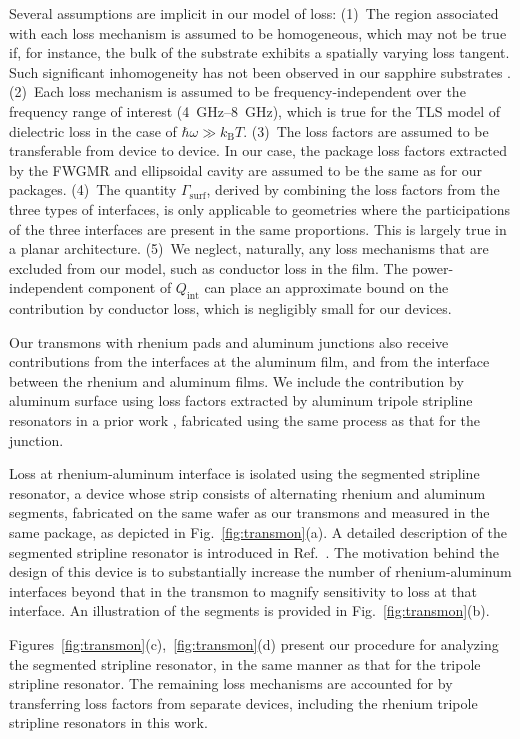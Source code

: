 \documentclass[
    reprint,
    superscriptaddress,
    amsmath,amssymb,
    aps,
    prb,
    floatfix,
]{revtex4-2}
\begin{document}
Several assumptions are implicit in our model of loss: (1)~The region associated with each loss mechanism is assumed to be homogeneous, which may not be true if, for instance, the bulk of the substrate exhibits a spatially varying loss tangent. Such significant inhomogeneity has not been observed in our sapphire substrates \cite{read2023,ganjam2024}. (2)~Each loss mechanism is assumed to be frequency-independent over the frequency range of interest (\SIrange{4}{8}{\giga\hertz}), which is true for the TLS model of dielectric loss in the case of $\hbar\omega \gg k_\mathrm{B}T$. (3)~The loss factors are assumed to be transferable from device to device. In our case, the package loss factors extracted by the FWGMR and ellipsoidal cavity are assumed to be the same as for our packages. (4)~The quantity $\Gamma_\mathrm{surf}$, derived by combining the loss factors from the three types of interfaces, is only applicable to geometries where the participations of the three interfaces are present in the same proportions. This is largely true in a planar architecture. (5)~We neglect, naturally, any loss mechanisms that are excluded from our model, such as conductor loss in the film. The power-independent component of $Q_\mathrm{int}$ can place an approximate bound on the contribution by conductor loss, which is negligibly small for our devices.

Our transmons with rhenium pads and aluminum junctions also receive contributions from the interfaces at the aluminum film, and from the interface between the rhenium and aluminum films. We include the contribution by aluminum surface using loss factors extracted by aluminum tripole stripline resonators in a prior work \cite{ganjam2024}, fabricated using the same process as that for the junction.

Loss at rhenium-aluminum interface is isolated using the segmented stripline resonator, a device whose strip consists of alternating rhenium and aluminum segments, fabricated on the same wafer as our transmons and measured in the same package, as depicted in Fig.~\ref{fig:transmon}(a). A detailed description of the segmented stripline resonator is introduced in Ref.~\cite{ganjam2024}. The motivation behind the design of this device is to substantially increase the number of rhenium-aluminum interfaces beyond that in the transmon to magnify sensitivity to loss at that interface. An illustration of the segments is provided in Fig.~\ref{fig:transmon}(b).

Figures~\ref{fig:transmon}(c),~\ref{fig:transmon}(d) present our procedure for analyzing the segmented stripline resonator, in the same manner as that for the tripole stripline resonator. The remaining loss mechanisms are accounted for by transferring loss factors from separate devices, including the rhenium tripole stripline resonators in this work.
\end{document}
